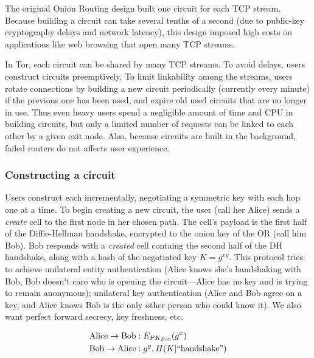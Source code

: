 \documentclass[times,10pt,twocolumn]{article}
\begin{document}

\label{subsec:circuits}


The original Onion Routing design built one circuit for each
TCP stream.  Because building a circuit can take several tenths of a
second (due to public-key cryptography delays and network latency),
this design imposed high costs on applications like web browsing that
open many TCP streams.

In Tor, each circuit can be shared by many TCP streams.  To avoid
delays, users construct circuits preemptively.  To limit linkability
among the streams, users rotate connections by building a new circuit
periodically (currently every minute) if the previous one has been
used, and expire old used circuits that are no longer in use. Thus
even heavy users spend a negligible amount of time and CPU in
building circuits, but only a limited number of requests can be linked
to each other by a given exit node. Also, because circuits are built
in the background, failed routers do not affects user experience.

\subsubsection{Constructing a circuit}

Users construct each incrementally, negotiating a symmetric key with
each hop one at a time. To begin creating a new circuit, the user
(call her Alice) sends a \emph{create} cell to the first node in her
chosen path. The cell's payload is the first half of the
Diffie-Hellman handshake, encrypted to the onion key of the OR (call
him Bob). Bob responds with a \emph{created} cell containg the second
half of the DH handshake, along with a hash of the negotiated key
$K=g^{xy}$.  This protocol tries to achieve unilateral entity
authentication (Alice knows she's handshaking with Bob, Bob doesn't
care who is opening the circuit---Alice has no key and is trying to
remain anonymous); unilateral key authentication (Alice and Bob
agree on a key, and Alice knows Bob is the only other person who could
know it).  We also want perfect forward
secrecy, key freshness, etc.

\begin{equation}
\begin{aligned}
\mathrm{Alice} \rightarrow \mathrm{Bob}&: E_{PK_{Bob}}(g^x) \\
\mathrm{Bob} \rightarrow \mathrm{Alice}&: g^y, H(K | \mathrm{``handshake"}) \\
\end{aligned}
\end{equation}
\end{document}
